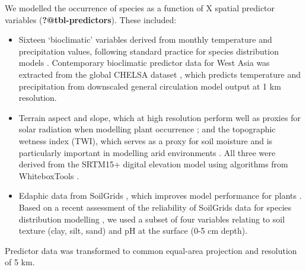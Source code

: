 \documentclass[
  authoryear,
  review]{elsarticle}
\providecommand{\tightlist}{%
  \setlength{\itemsep}{0pt}\setlength{\parskip}{0pt}}\usepackage{longtable,booktabs,array}
\begin{document}
We modelled the occurrence of species as a function of X spatial
predictor variables (\textbf{?@tbl-predictors}). These included:

\begin{itemize}
\tightlist
\item
  Sixteen `bioclimatic' variables derived from monthly temperature and
  precipitation values, following standard practice for species
  distribution models \citep{HijmansEtAl2005}. Contemporary bioclimatic
  predictor data for West Asia was extracted from the global CHELSA
  dataset \citep{KargerEtAl2017}, which predicts temperature and
  precipitation from downscaled general circulation model output at 1 km
  resolution.
\end{itemize}

\begin{itemize}
\tightlist
\item
  Terrain aspect and slope, which at high resolution perform well as
  proxies for solar radiation when modelling plant occurrence
  \citep{AustinVanNiel2011, LeempoelEtAl2015}; and the topographic
  wetness index (TWI), which serves as a proxy for soil moisture and is
  particularly important in modelling arid environments
  \citep{KopeckyCizkova2010, CamposEtAl2016, DiVirgilioEtAl2018}. All
  three were derived from the SRTM15+ digital elevation model using
  algorithms from WhiteboxTools \citep{Lindsay2016}.
\end{itemize}

\begin{itemize}
\tightlist
\item
  Edaphic data from SoilGrids \citep{HenglEtAl2014, HenglEtAl2017},
  which improves model performance for plants
  \citep{DubuisEtAl2013, ModEtAl2016, VelazcoEtAl2017}. Based on a
  recent assessment of the reliability of SoilGrids data for species
  distribution modelling \citep{MillerEtAl2024}, we used a subset of
  four variables relating to soil texture (clay, silt, sand) and pH at
  the surface (0-5 cm depth).
\end{itemize}

Predictor data was transformed to common equal-area projection and
resolution of 5 km.
\end{document}
